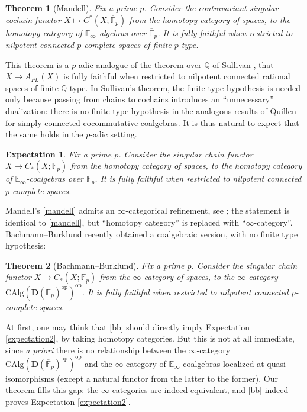 \documentclass{proc-l}
\theoremstyle{plain}
\newtheorem{theorem}{Theorem}[section]
\newtheorem{expectation}[{theorem}]{Expectation}
\theoremstyle{definition}
\theoremstyle{remark}
\begin{document}
\begin{theorem}[{Mandell}]%
\label{Theorem:1.11}\label{mandell}
Fix a prime $p$. Consider the contravariant singular cochain functor $X \mapsto C^*(X;\overline{\mathbb{F}}_p)$ from the homotopy category of spaces, to the homotopy category of $\mathbb E_\infty$-algebras over $\overline{\mathbb{F}}_p$. It is fully faithful when restricted to  nilpotent connected $p$-complete spaces of finite $p$-type.
\end{theorem}
This theorem is a $p$-adic analogue of the theorem over $\mathbb Q$ of  Sullivan \cite{sullivan}, that $X \mapsto A_{\mathit{PL}}(X)$ is fully faithful when restricted to nilpotent connected rational spaces of finite $\mathbb Q$-type. In Sullivan's theorem, the finite type hypothesis is needed only because passing from chains to cochains introduces an ``unnecessary'' dualization: there is no finite type hypothesis in the analogous results of Quillen \cite{quillen69} for simply-connected cocommutative coalgebras. It is thus natural to expect that the same holds in the $p$-adic setting.

\begin{expectation}%
\label{Expectation:1.12}\label{expectation2}
Fix a prime $p$. Consider the singular chain functor $X \mapsto C_*(X;\overline{\mathbb{F}}_p)$ from the homotopy category of spaces, to the homotopy category of $\mathbb E_\infty$-coalgebras over $\overline{\mathbb{F}}_p$. It is fully faithful when restricted to  nilpotent connected $p$-complete spaces.
\end{expectation}

Mandell's \cref{mandell} admits an $\infty$-categorical refinement, see \cite{Lurie11Rational}; the statement is identical to \cref{mandell}, but ``homotopy category'' is replaced with ``$\infty$-category''. Bachmann--Burklund \cite{bachmann2024} recently obtained a coalgebraic version, with no finite type hypothesis:

\begin{theorem}[{Bachmann--Burklund}]%
\label{Theorem:1.13}\label{bb} Fix a prime $p$. Consider the singular chain functor $X \mapsto C_*(X;\overline{\mathbb{F}}_p)$ from the $\infty$-category of spaces, to the $\infty$-category $\mathrm{CAlg}(\mathbf D(\overline{\mathbb{F}}_p)^{\mathrm{op}})^{\mathrm{op}}$. It is fully faithful when restricted to  nilpotent connected $p$-complete spaces.
\end{theorem}

At first, one may think that \cref{bb} should directly imply Expectation \ref{expectation2}, by taking homotopy categories. But this is not at all immediate, since \emph{a priori} there is no relationship between the $\infty$-category $\mathrm{CAlg}(\mathbf D(\overline{\mathbb{F}}_p)^{\mathrm{op}})^{\mathrm{op}}$ and the $\infty$-category of $\mathbb E_\infty$-coalgebras localized at quasi-isomorphisms (except a natural functor from the latter to the former). Our theorem fills this gap: the $\infty$-categories are indeed equivalent, and \cref{bb} indeed proves Expectation \ref{expectation2}.
\end{document}
